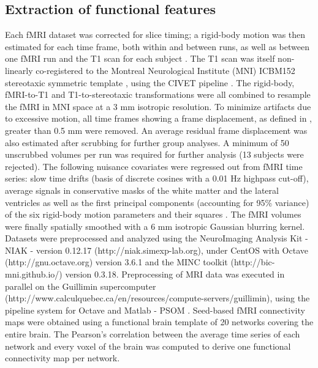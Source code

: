 \documentclass[authoryear]{elsarticle}
\begin{document}
\subsection*{Extraction of functional features}
Each fMRI dataset was corrected for slice timing; a rigid-body motion was then estimated for each time frame, both within and between runs, as well as between one fMRI run and the T1 scan for each subject \citep{Collins1994}. The T1 scan was itself non-linearly co-registered to the Montreal Neurological Institute (MNI) ICBM152 stereotaxic symmetric template \citep{Fonov2011}, using the CIVET pipeline \citep{Ad-Dab'bagh2006}. The rigid-body, fMRI-to-T1 and T1-to-stereotaxic transformations were all combined to resample the fMRI in MNI space at a 3 mm isotropic resolution. To minimize artifacts due to excessive motion, all time frames showing a frame displacement, as defined in \cite{Power2012}, greater than 0.5 mm were removed. An average residual frame displacement was also estimated after scrubbing for further group analyses. A minimum of 50 unscrubbed volumes per run was required for further analysis (13 subjects were rejected). The following nuisance covariates were regressed out from fMRI time series: slow time drifts (basis of discrete cosines with a 0.01 Hz highpass cut-off), average signals in conservative masks of the white matter and the lateral ventricles as well as the first principal components (accounting for 95\% variance) of the six rigid-body motion parameters and their squares \citep{Giove2009,Lund2006}. The fMRI volumes were finally spatially smoothed with a 6 mm isotropic Gaussian blurring kernel. Datasets were preprocessed and analyzed using the NeuroImaging Analysis Kit - NIAK - version 0.12.17 (http://niak.simexp-lab.org), under CentOS with Octave (http://gnu.octave.org) version 3.6.1 and the MINC toolkit (http://bic-mni.github.io/) version 0.3.18. Preprocessing of MRI data was executed in parallel on the Guillimin supercomputer (http://www.calculquebec.ca/en/resources/compute-servers/guillimin), using the pipeline system for Octave and Matlab - PSOM \citep{Bellec2012}. Seed-based fMRI connectivity maps were obtained using a functional brain template of 20 networks covering the entire brain. The Pearson's correlation between the average time series of each network and every voxel of the brain was computed to derive one functional connectivity map per network.
\end{document}

